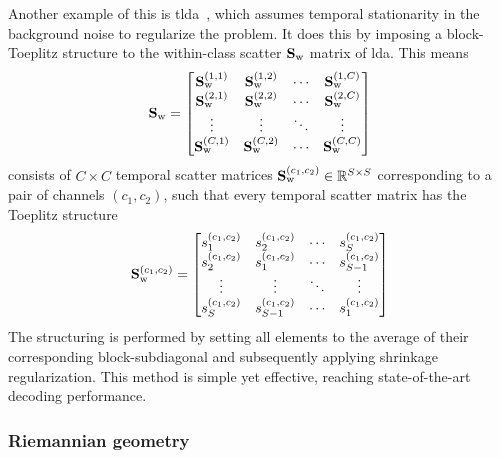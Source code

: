 Another example of this is \ac{tlda}~\cite{Sosulski2022}, which assumes temporal
stationarity in the background noise to regularize the problem.
It does this by imposing a block-Toeplitz structure to the within-class
scatter $\mathbf{S}_\text{w}$ matrix of \ac{lda}.
This means
\begin{equation}
  \mathbf{S}_\text{w} = \begin{bmatrix}
    \mathbf{S}_\text{w}^{(1,1)} & \mathbf{S}_\text{w}^{(1,2)} & \cdots & \mathbf{S}_\text{w}^{(1,C)}\\
    \mathbf{S}_\text{w}^{(2,1)} & \mathbf{S}_\text{w}^{(2,2)} & \cdots & \mathbf{S}_\text{w}^{(2,C)}\\
    \vdots             & \vdots             & \ddots & \vdots            \\
    \mathbf{S}_\text{w}^{(C,1)} & \mathbf{S}_\text{w}^{(C,2)} & \cdots & \mathbf{S}_\text{w}^{(C,C)}\\
  \end{bmatrix}
\end{equation}
consists of $C\times C$ temporal scatter matrices
$\mathbf{S}_\text{w}^{(c_1,c_2)}\in\mathbb{R}^{S\times S}$
corresponding to a pair of channels $(c_1,c_2)$, such
that every temporal scatter matrix has the Toeplitz structure
\begin{equation}
  \mathbf{S}_\text{w}^{(c_1,c_2)} = \begin{bmatrix}
    s_1^{(c_1,c_2)}  & s_2^{(c_1,c_2)}  & \cdots & s_S^{(c_1,c_2)}  \\
    s_2^{(c_1,c_2)}  & s_1^{(c_1,c_2)}  & \cdots & s_{S-1}^{(c_1,c_2)}  \\
    \vdots & \vdots &  \ddots & \vdots \\
    s_S^{(c_1,c_2)}  & s_{S-1}^{(c_1,c_2)}  & \cdots & s_1^{(c_1,c_2)}
\end{bmatrix}
\end{equation}
The structuring is performed by setting all elements to the average of their
corresponding block-subdiagonal and subsequently applying shrinkage
regularization.
This method is simple yet effective, reaching state-of-the-art decoding performance.

\subsubsection{Riemannian geometry}

